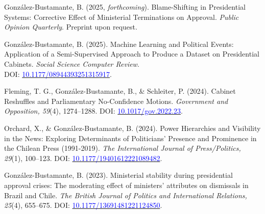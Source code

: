 \begin{publications}

\begin{benumerate}{13}

\item{González-Bustamante, B. (2025, {\itshape forthcoming}). Blame-Shifting in Presidential Systems: Corrective Effect of Ministerial Terminations on Approval. {\itshape Public Opinion Quarterly}. Preprint upon request.}\vspace{1mm}

\item{González-Bustamante, B. (2025). Machine Learning and Political Events: Application of a Semi-Supervised Approach to Produce a Dataset on Presidential Cabinets. {\itshape Social Science Computer Review}. \\ DOI: \href{https://doi.org/10.1177/08944393251315917}{\textcolor{blue}{10.1177/08944393251315917}}.}\vspace{1mm} %

\item{Fleming, T. G., González-Bustamante, B., \& Schleiter, P. (2024). Cabinet Reshuffles and Parliamentary No-Confidence Motions. {\itshape Government and Opposition, 59}(4), 1274--1288. DOI: \href{https://doi.org/10.1017/gov.2022.23}{\textcolor{blue}{10.1017/gov.2022.23}}.}\vspace{1mm}

\item{Orchard, X., \& González-Bustamante, B. (2024). Power Hierarchies and Visibility in the News: Exploring Determinants of Politicians’ Presence and Prominence in the Chilean Press (1991-2019). {\itshape The International Journal of Press/Politics, 29}(1), 100--123. DOI: \href{https://doi.org/10.1177/19401612221089482}{\textcolor{blue}{10.1177/19401612221089482}}.}\vspace{1mm}

\item{González-Bustamante, B. (2023). Ministerial stability during presidential approval crises: The moderating effect of ministers' attributes on dismissals in Brazil and Chile. {\itshape The British Journal of Politics and International Relations, 25}(4), 655--675. DOI: \href{https://doi.org/10.1177/13691481221124850}{\textcolor{blue}{10.1177/13691481221124850}}.}\vspace{1mm}


\end{benumerate}
\end{publications}
